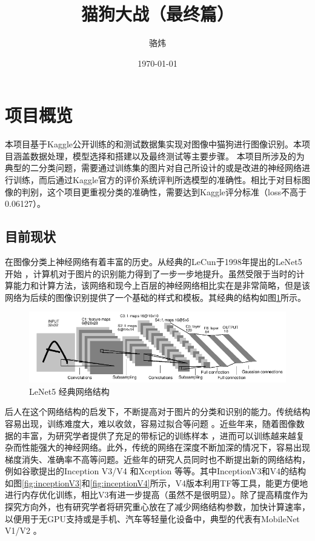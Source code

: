 \documentclass[a4paper,11pt]{article}
\author{骆炜}
\date{\today}
\title{猫狗大战（最终篇）}
\begin{document}
\maketitle
\tableofcontents


\section{项目概览}
\label{sec:org9b67672}
本项目基于Kaggle公开训练的和测试数据集实现对图像中猫狗进行图像识别。本项目涵盖数据处理，模型选择和搭建以及最终测试等主要步骤。
本项目所涉及的为典型的二分类问题，需要通过训练集的图片对自己所设计的或是改进的神经网络进行训练，而后通过Kaggle官方的评价系统评判所选模型的准确性。相比于对目标图像的判别，这个项目更重视分类的准确性，需要达到Kaggle评分标准（loss不高于0.06127）。

\subsection{目前现状}
\label{sec:orgba8b7f1}
在图像分类上神经网络有着丰富的历史。从经典的LeCun于1998年提出的LeNet5开始 \cite{KrizhevskySutskeverHinton2017} ，计算机对于图片的识别能力得到了一步一步地提升。虽然受限于当时的计算能力和计算方法，该网络和现今上百层的神经网络相比实在是非常简略，但是该网络为后续的图像识别提供了一个基础的样式和模板。其经典的结构如图\ref{fig:lenet5}所示。

\begin{figure}[htb]
\centering
\includegraphics[scale=0.4]{./figure/lenet5.png}
\caption{LeNet5 经典网络结构}
\label{fig:lenet5}
\end{figure}

后人在这个网络结构的启发下，不断提高对于图片的分类和识别的能力。传统结构容易出现，训练难度大，难以收敛，容易过拟合等问题 \cite{Jabbar_2014} 。近些年来，随着图像数据的丰富，为研究学者提供了充足的带标记的训练样本 \cite{Fei_Fei_2010} ，进而可以训练越来越复杂而性能强大的神经网络。此外，传统的网络在深度不断加深的情况下，容易出现梯度消失、准确率不高等问题。近些年的研究人员同时也不断提出新的网络结构，例如谷歌提出的Inception V3/V4 \cite{SzegedyIoffeVanhoucke2016} 和Xception \cite{Chollet_2017} 等等。其中InceptionV3和V4的结构如图\ref{fig:inceptionV3}和\ref{fig:inceptionV4}所示，V4版本利用TF等工具，能更方便地进行内存优化训练，相比V3有进一步提高（虽然不是很明显）。除了提高精度作为探究方向外，也有研究学者将研究重心放在了减少网络结构参数，加快计算速率，以便用于无GPU支持或是手机、汽车等轻量化设备中，典型的代表有MobileNet V1/V2 \cite{Su_2018}。
\end{document}
